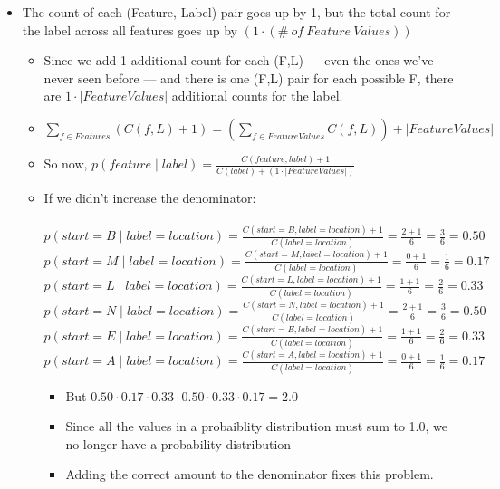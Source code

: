 \documentclass[11pt,letterpaper]{article}
\begin{document}
\begin{itemize}
  \item The count of each (Feature, Label) pair goes up by 1, but the total count for the label across all features goes up by $(1 \cdot (\#~of~Feature~Values))$
    \begin{itemize}
      \item Since we add 1 additional count for each (F,L) --- even the ones we've never seen before --- and there is one (F,L) pair for each possible F, there are $1 \cdot |FeatureValues|$ additional counts for the label.
      \item $\sum_{f \in Features} (C(f,L)+1) = \left(\sum_{f \in FeatureValues} C(f,L)\right) + |FeatureValues|$
      \item So now, $p(feature \mid label) = \frac{C(feature,label)+1}{C(label) + (1 \cdot |FeatureValues|)}$
      \\
      \item If we didn't increase the denominator: \\\\
          $p(start=B \mid label=location) = \frac{C(start=B, label=location)+1}{C(label=location)} = \frac{2+1}{6} = \frac{3}{6} = 0.50$ \\
          $p(start=M \mid label=location) = \frac{C(start=M, label=location)+1}{C(label=location)} = \frac{0+1}{6} = \frac{1}{6} = 0.17$ \\
          $p(start=L \mid label=location) = \frac{C(start=L, label=location)+1}{C(label=location)} = \frac{1+1}{6} = \frac{2}{6} = 0.33$ \\
          $p(start=N \mid label=location) = \frac{C(start=N, label=location)+1}{C(label=location)} = \frac{2+1}{6} = \frac{3}{6} = 0.50$ \\
          $p(start=E \mid label=location) = \frac{C(start=E, label=location)+1}{C(label=location)} = \frac{1+1}{6} = \frac{2}{6} = 0.33$ \\
          $p(start=A \mid label=location) = \frac{C(start=A, label=location)+1}{C(label=location)} = \frac{0+1}{6} = \frac{1}{6} = 0.17$
        \begin{itemize}
          \item But $0.50 \cdot 0.17 \cdot 0.33 \cdot 0.50 \cdot 0.33 \cdot 0.17 = 2.0$ 
          \item Since all the values in a probaiblity distribution must sum to 1.0, we no longer have a probability distribution
          \item Adding the correct amount to the denominator fixes this problem.
        \end{itemize}
    \end{itemize}


\end{itemize}
\end{document}
